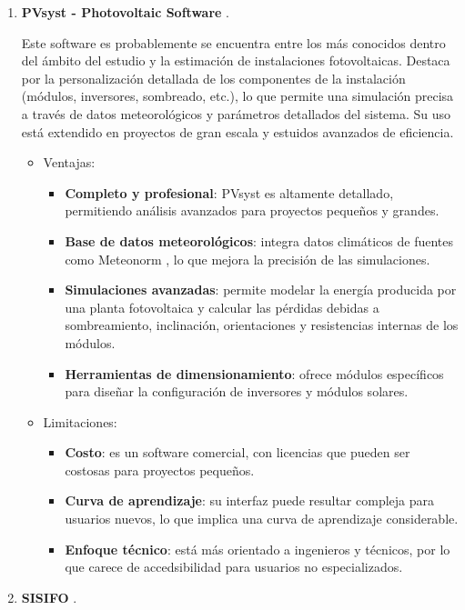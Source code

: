 \begin{enumerate}
\item \textbf{PVsyst - Photovoltaic Software} \cite{pvsyst}.

Este software es probablemente se encuentra entre los más conocidos dentro del ámbito del estudio y la estimación de instalaciones fotovoltaicas. Destaca por la personalización detallada de los componentes de la instalación (módulos, inversores, sombreado, etc.), lo que permite una simulación precisa a través de datos meteorológicos y parámetros detallados del sistema. Su uso está extendido en proyectos de gran escala y estuidos avanzados de eficiencia.
\begin{itemize}
\item Ventajas:
\begin{itemize}
\item \textbf{Completo y profesional}: PVsyst es altamente detallado, permitiendo análisis avanzados para proyectos pequeños y grandes.
\item \textbf{Base de datos meteorológicos}: integra datos climáticos de fuentes como Meteonorm \cite{jan20}, lo que mejora la precisión de las simulaciones.
\item \textbf{Simulaciones avanzadas}: permite modelar la energía producida por una planta fotovoltaica y calcular las pérdidas debidas a sombreamiento, inclinación, orientaciones y resistencias internas de los módulos.
\item \textbf{Herramientas de dimensionamiento}: ofrece módulos específicos para diseñar la configuración de inversores y módulos solares.
\end{itemize}
\item Limitaciones:
\begin{itemize}
\item \textbf{Costo}: es un software comercial, con licencias que pueden ser costosas para proyectos pequeños.
\item \textbf{Curva de aprendizaje}: su interfaz puede resultar compleja para usuarios nuevos, lo que implica una curva de aprendizaje considerable.
\item \textbf{Enfoque técnico}: está más orientado a ingenieros y técnicos, por lo que carece de accedsibilidad para usuarios no especializados.
\end{itemize}
\end{itemize}
\item \textbf{SISIFO} \cite{sisifo}.


\end{enumerate}
